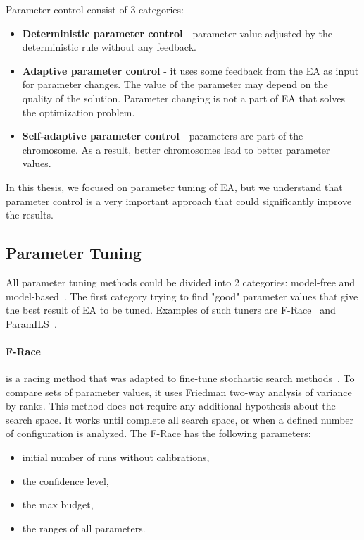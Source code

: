 Parameter control consist of 3 categories:
\begin{itemize}
	\item \textbf{Deterministic parameter control} - parameter value adjusted by the deterministic rule without any feedback. 
	\item \textbf{Adaptive parameter control} - it uses some feedback from the EA as input for parameter changes. The value of the parameter may depend on the quality of the solution. Parameter changing is not a part of EA that solves the optimization problem.
	\item \textbf{Self-adaptive parameter control} - parameters are part of the chromosome. As a result, better chromosomes lead to better parameter values.
\end{itemize}
In this thesis, we focused on parameter tuning of EA, but we understand that parameter control is a very important approach that could significantly improve the results.

\subsection{Parameter Tuning}\label{sec:parameterTuning}
All parameter tuning methods could be divided into 2 categories: model-free and model-based~\cite{hutter2010}.
The first category trying to find "good" parameter values that give the best result of EA to be tuned. Examples of such tuners are F-Race~\cite{birattari2010f} and ParamILS~\cite{hutter2009paramils}.

\paragraph{F-Race} is a racing method that was adapted to fine-tune stochastic search methods~\cite{montero2012state}. To compare sets of parameter values, it uses Friedman two-way analysis\cite{theodorsson87} of variance by ranks. This method does not require any additional hypothesis about the search space. It works until complete all search space, or when a defined number of configuration is analyzed. The F-Race has the following parameters:
\begin{itemize}
	\item initial number of runs without calibrations,
	\item the confidence level,
	\item the max budget,
	\item the ranges of all parameters.
\end{itemize}


